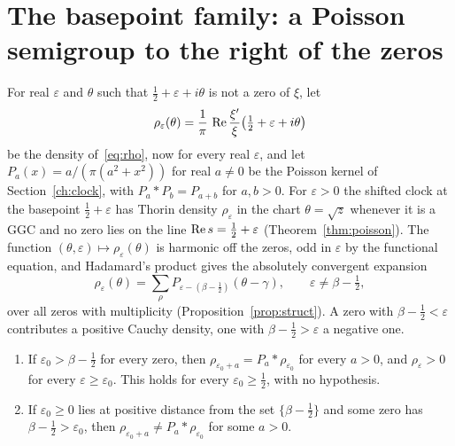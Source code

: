 \section{The basepoint family: a Poisson semigroup to the right of the zeros}\label{tf:sec:poisson}

For real $\varepsilon$ and $\theta$ such that $\tfrac12+\varepsilon+i\theta$ is not a zero of $\xi$, let
\[
\rho_\varepsilon(\theta)=\frac1\pi\,\operatorname{Re}\frac{\xi'}{\xi}\big(\tfrac12+\varepsilon+i\theta\big)
\]
be the density of~\eqref{eq:rho}, now for every real $\varepsilon$, and let $P_a(x)=a/(\pi(a^2+x^2))$ for real $a\ne0$ be the Poisson kernel of Section~\ref{ch:clock}, with $P_a*P_b=P_{a+b}$ for $a,b>0$. For $\varepsilon>0$ the shifted clock at the basepoint $\tfrac12+\varepsilon$ has Thorin density $\rho_\varepsilon$ in the chart $\theta=\sqrt z$ whenever it is a GGC and no zero lies on the line $\operatorname{Re} s=\tfrac12+\varepsilon$ (Theorem~\ref{thm:poisson}). The function $(\theta,\varepsilon)\mapsto\rho_\varepsilon(\theta)$ is harmonic off the zeros, odd in $\varepsilon$ by the functional equation, and Hadamard's product gives the absolutely convergent expansion
\begin{equation}\label{tf:eq:poissonform}
\rho_\varepsilon(\theta)=\sum_\rho P_{\varepsilon-(\beta-\frac12)}(\theta-\gamma),\qquad \varepsilon\ne\beta-\tfrac12,
\end{equation}
over all zeros with multiplicity (Proposition~\ref{prop:struct}). A zero with $\beta-\tfrac12<\varepsilon$ contributes a positive Cauchy density, one with $\beta-\tfrac12>\varepsilon$ a negative one.

\begin{theorem}\label{tf:thm:poisson}
\begin{enumerate}
\item[(a)] If $\varepsilon_0>\beta-\tfrac12$ for every zero, then $\rho_{\varepsilon_0+a}=P_a*\rho_{\varepsilon_0}$ for every $a>0$, and $\rho_\varepsilon>0$ for every $\varepsilon\ge\varepsilon_0$. This holds for every $\varepsilon_0\ge\tfrac12$, with no hypothesis.
\item[(b)] If $\varepsilon_0\ge0$ lies at positive distance from the set $\{\beta-\tfrac12\}$ and some zero has $\beta-\tfrac12>\varepsilon_0$, then $\rho_{\varepsilon_0+a}\ne P_a*\rho_{\varepsilon_0}$ for some $a>0$.
\end{enumerate}
\end{theorem}

